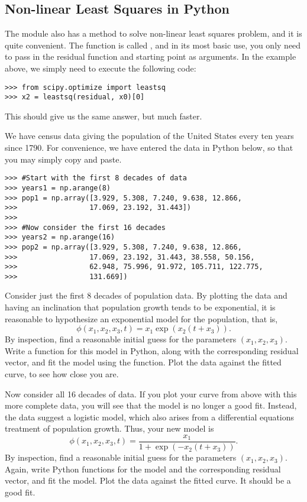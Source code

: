 \subsection*{Non-linear Least Squares in Python}
The module  also has a method to solve non-linear least squares problem, and it
is quite convenient. The function is called , and in its most basic use, you only need
to pass in the residual function and starting point as arguments. In the example above, we simply
need to execute the following code:
\begin{lstlisting}
>>> from scipy.optimize import leastsq
>>> x2 = leastsq(residual, x0)[0]
\end{lstlisting}
This should give us the same answer, but much faster.
\begin{problem}
We have census data giving the population of the United States every ten years since 1790.
For convenience, we have entered the data in Python below, so that you may simply copy and
paste.
\begin{lstlisting}
>>> #Start with the first 8 decades of data
>>> years1 = np.arange(8)
>>> pop1 = np.array([3.929, 5.308, 7.240, 9.638, 12.866,
>>>                 17.069, 23.192, 31.443])
>>>
>>> #Now consider the first 16 decades
>>> years2 = np.arange(16)
>>> pop2 = np.array([3.929, 5.308, 7.240, 9.638, 12.866,
>>>                 17.069, 23.192, 31.443, 38.558, 50.156,
>>>                 62.948, 75.996, 91.972, 105.711, 122.775,
>>>                 131.669])
\end{lstlisting}
Consider just the first 8 decades of population data. By plotting the data and having
an inclination that population growth tends to be exponential, it is reasonable to
hypothesize an exponential model for the population, that is,
$$
\phi(x_1,x_2,x_3,t) = x_1\exp(x_2(t+x_3)).
$$
By inspection, find a reasonable
initial guess for the parameters $(x_1, x_2, x_3)$.
Write a function for this model in Python, along with the corresponding residual vector,
and fit the model using the  function.  Plot the data against the fitted curve,
to see how close you are.

Now consider all 16 decades of data. If you plot your curve from above with this more complete
data, you will see that the model is no longer a good fit. Instead, the data suggest
a logistic model, which also arises from a differential equations treatment of population growth.
Thus, your new model is
$$
\phi(x_1,x_2,x_3,t) = \frac{x_1}{1+\exp(-x_2(t+x_3))}.
$$
By inspection, find a reasonable
initial guess for the parameters $(x_1, x_2, x_3)$.
Again, write Python functions for the model and the corresponding residual vector,
and fit the model. Plot the data against the fitted curve. It should be a good fit.
\end{problem} 